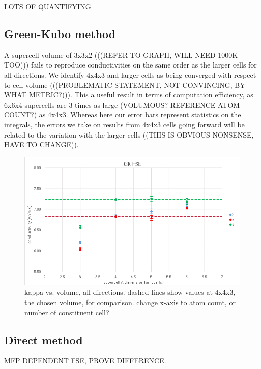 \documentclass[%
preprint,                                  %
nofootinbib,
 amsmath,amssymb,
 aps,
]{revtex4-1}
\begin{document}
LOTS OF QUANTIFYING

\subsection{\label{sec:results.gk}Green-Kubo method}

A supercell volume of 3x3x2 (((REFER TO GRAPH, WILL NEED 1000K TOO))) fails to reproduce conductivities on the same order as the larger cells for all directions. We identify 4x4x3 and larger cells as being converged with respect to cell volume (((PROBLEMATIC STATEMENT, NOT CONVINCING, BY WHAT METRIC?))). This a useful result in terms of computation efficiency, as 6x6x4 supercells are 3 times as large (VOLUMOUS? REFERENCE ATOM COUNT?) as 4x4x3. Whereas here our error bars represent statistics on the integrals, the errors we take on results from 4x4x3 cells going forward will be related to the variation with the larger cells ((THIS IS OBVIOUS NONSENSE, HAVE TO CHANGE)).

\begin{figure}[h!]
  \includegraphics[width=\linewidth]{images/gk_fse_draft.png}
  \caption{kappa vs. volume, all directions. dashed lines show values at 4x4x3, the chosen volume, for comparison. change x-axis to atom count, or number of constituent cell?}
  \label{fig:gk_fse}
\end{figure}








\subsection{\label{sec:results.direct}Direct method}

MFP DEPENDENT FSE, PROVE DIFFERENCE. 
\end{document}
